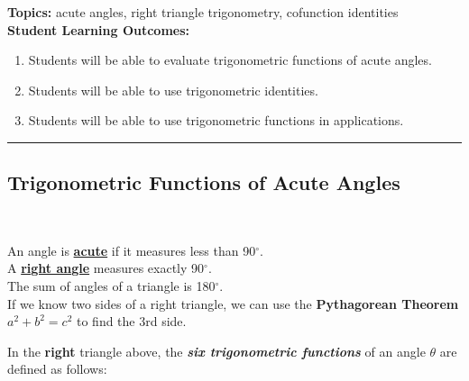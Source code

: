 

\noindent \textbf{Topics:}  acute angles, right triangle trigonometry, cofunction identities\\

\noindent \textbf{Student Learning Outcomes:}
\begin{enumerate}
\item Students will be able to evaluate trigonometric functions of acute angles.
\item Students will be able to use trigonometric identities.
\item Students will be able to use trigonometric functions in applications.
\end{enumerate}

\hrule 

\bigskip

\subsection{Trigonometric Functions of Acute Angles} ~

\noindent An angle is \textbf{\underline{acute}} if it measures less than 90$^{\circ}$.\\
A \textbf{\underline{right angle}} measures exactly 90$^{\circ}$.\\
The sum of angles of a triangle is 180$^{\circ}$.\\[.2in]

\noindent If we know two sides of a right triangle, we can use the \textbf{Pythagorean Theorem} $a^2+b^2=c^2$ to find the 3rd side.

\begin{center}
\end{center}

In the \textbf{right} triangle above, the \textbf{\emph{six
    trigonometric functions}} of an angle $\theta$ are defined as
follows:

